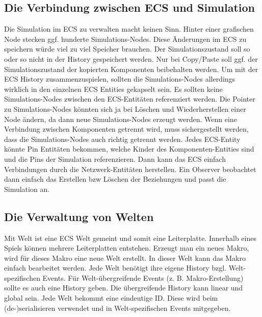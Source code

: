 \documentclass[11pt]{article}
\begin{document}
    \subsection{Die Verbindung zwischen ECS und Simulation}
    Die Simulation im ECS zu verwalten macht keinen Sinn.
    Hinter einer grafischen Node stecken ggf. hunderte Simulations-Nodes.
    Diese Änderungen im ECS zu speichern würde viel zu viel Speicher brauchen.
    Der Simulationszustand soll so oder so nicht in der History gespeichert werden.
    Nur bei Copy/Paste soll ggf. der Simulationszustand der kopierten Komponenten beibehalten werden.
    Um mit der ECS History zusammenzuspielen, sollten die Simulations-Nodes allerdings wirklich in den einzelnen
    ECS Entities gekapselt sein.
    Es sollten keine Simulations-Nodes zwischen den ECS-Entitäten referenziert werden.
    Die Pointer zu Simulations-Nodes könnten sich ja bei Löschen und Wiederherstellen einer Node ändern, da dann
    neue Simulations-Nodes erzeugt werden.
    Wenn eine Verbindung zwischen Komponenten getrennt wird, muss sichergestellt werden, dass die Simulations-Nodes auch richtig getrennt
    werden.
    Jedes ECS-Entity könnte Pin Entitäten bekommen, welche Kinder des Komponenten-Entities sind und die Pins der Simulation referenzieren.
    Dann kann das ECS einfach Verbindungen durch die Netzwerk-Entitäten herstellen.
    Ein Observer beobachtet dann einfach das Erstellen bzw Löschen der Beziehungen und passt die Simulation an.

    \subsection{Die Verwaltung von Welten}
    Mit Welt ist eine ECS Welt gemeint und somit eine Leiterplatte.
    Innerhalb eines Spiels können mehrere Leiterplatten entstehen.
    Erzeugt man ein neues Makro, wird für dieses Makro eine neue Welt erstellt.
    In dieser Welt kann das Makro einfach bearbeitet werden.
    Jede Welt benötigt ihre eigene History bzgl. Welt-spezifischen Events.
    Für Welt-übergreifende Events (z. B. Makro-Erstellung) sollte es auch eine History geben.
    Die übergreifende History kann linear und global sein.
    Jede Welt bekommt eine eindeutige ID.
    Diese wird beim (de-)serialisieren verwendet und in Welt-spezifischen Events mitgegeben.
\end{document}
